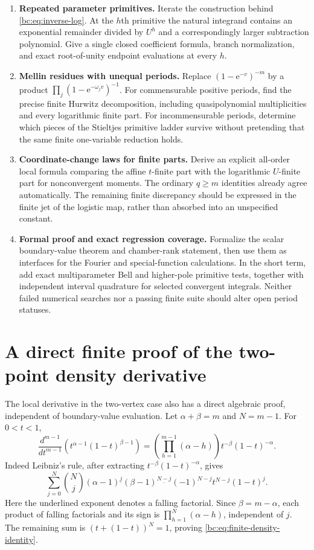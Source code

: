 \documentclass[11pt,letterpaper]{article}
\numberwithin{equation}{section}
\theoremstyle{definition}
\theoremstyle{remark}
\newcommand{\bce}{\mathrm e}
\begin{document}
\begin{enumerate}
\item \textbf{Repeated parameter primitives.}
Iterate the construction behind \eqref{bc:eq:inverse-log}. At the $h$th
primitive the natural integrand contains an exponential remainder divided
by $U^h$ and a correspondingly larger subtraction polynomial. Give a
single closed coefficient formula, branch normalization, and exact
root-of-unity endpoint evaluations at every $h$.

\item \textbf{Mellin residues with unequal periods.}
Replace $(1-\bce^{-v})^{-m}$ by a product
$\prod_j(1-\bce^{-\omega_jv})^{-1}$. For commensurable positive periods,
find the precise finite Hurwitz decomposition, including quasipolynomial
multiplicities and every logarithmic finite part. For incommensurable
periods, determine which pieces of the Stieltjes primitive ladder survive
without pretending that the same finite one-variable reduction holds.

\item \textbf{Coordinate-change laws for finite parts.}
Derive an explicit all-order local formula comparing the affine
$t$-finite part with the logarithmic $U$-finite part for nonconvergent
moments. The ordinary $q\ge m$ identities already agree automatically.
The remaining finite discrepancy should be expressed in the finite jet
of the logistic map, rather than absorbed into an unspecified constant.

\item \textbf{Formal proof and exact regression coverage.}
Formalize the scalar boundary-value theorem and chamber-rank statement,
then use them as interfaces for the Fourier and special-function
calculations. In the short term, add exact multiparameter Bell and
higher-pole primitive tests, together with independent interval
quadrature for selected convergent integrals. Neither failed numerical
searches nor a passing finite suite should alter open period statuses.
\end{enumerate}

\appendix
\section{A direct finite proof of the two-point density derivative}
\label{bc:app:finite-density}

The local derivative in the two-vertex case also has a direct algebraic
proof, independent of boundary-value evaluation. Let $\alpha+\beta=m$
and $N=m-1$. For $0<t<1$,
\begin{equation}\label{bc:eq:finite-density-identity}
 \frac{d^{m-1}}{dt^{m-1}}
      \left(t^{\alpha-1}(1-t)^{\beta-1}\right)
 =\left(\prod_{h=1}^{m-1}(\alpha-h)\right)t^{-\beta}(1-t)^{-\alpha}.
\end{equation}
Indeed Leibniz's rule, after extracting
$t^{-\beta}(1-t)^{-\alpha}$, gives
\[
 \sum_{j=0}^{N}\binom Nj
  (\alpha-1)^{\underline j}
  (\beta-1)^{\underline{N-j}}(-1)^{N-j}
  t^{N-j}(1-t)^j.
\]
Here the underlined exponent denotes a falling factorial. Since
$\beta=m-\alpha$, each product of falling factorials and its sign is
$\prod_{h=1}^{N}(\alpha-h)$, independent of $j$. The remaining sum is
$(t+(1-t))^N=1$, proving \eqref{bc:eq:finite-density-identity}.
\end{document}
